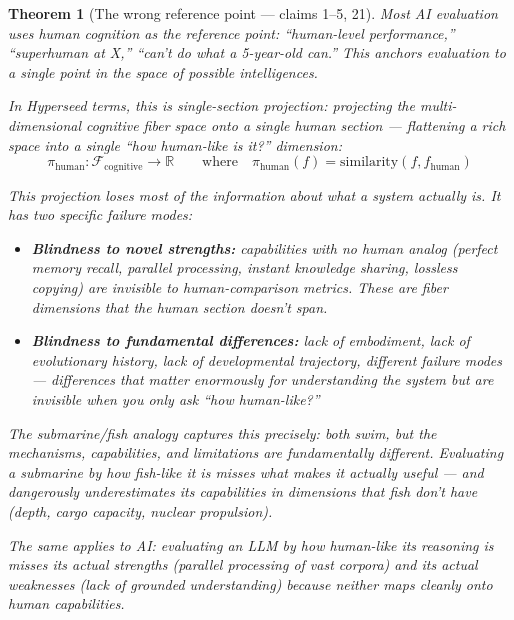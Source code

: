 \documentclass[11pt,a4paper]{article}
\newtheorem{theorem}[definition]{Theorem}
\begin{document}
\begin{theorem}[The wrong reference point --- claims 1--5, 21]
\label{thm:bias}
Most AI evaluation uses human cognition as the reference point:
``human-level performance,'' ``superhuman at X,'' ``can't do what
a 5-year-old can.'' This anchors evaluation to a single point in
the space of possible intelligences.

In Hyperseed terms, this is \emph{single-section projection}:
projecting the multi-dimensional cognitive fiber space onto a single
human section --- flattening a rich space into a single ``how
human-like is it?'' dimension:
\[
  \pi_{\text{human}}: \mathcal{F}_{\text{cognitive}} \to \mathbb{R}
  \qquad \text{where} \quad \pi_{\text{human}}(f) =
  \text{similarity}(f, f_{\text{human}})
\]

This projection loses most of the information about what a system
actually is. It has two specific failure modes:
\begin{itemize}
\item \textbf{Blindness to novel strengths:} capabilities with no
  human analog (perfect memory recall, parallel processing, instant
  knowledge sharing, lossless copying) are invisible to human-comparison
  metrics. These are fiber dimensions that the human section doesn't
  span.
\item \textbf{Blindness to fundamental differences:} lack of embodiment,
  lack of evolutionary history, lack of developmental trajectory,
  different failure modes --- differences that matter enormously for
  understanding the system but are invisible when you only ask ``how
  human-like?''
\end{itemize}

The submarine/fish analogy captures this precisely: both swim, but the
mechanisms, capabilities, and limitations are fundamentally different.
Evaluating a submarine by how fish-like it is misses what makes it
actually useful --- and dangerously underestimates its capabilities
in dimensions that fish don't have (depth, cargo capacity, nuclear
propulsion).

The same applies to AI: evaluating an LLM by how human-like its
reasoning is misses its actual strengths (parallel processing of
vast corpora) and its actual weaknesses (lack of grounded understanding)
because neither maps cleanly onto human capabilities.
\end{theorem}

\end{document}
